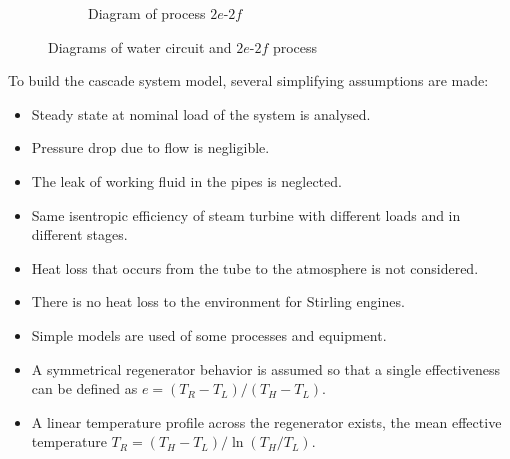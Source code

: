 \begin{figure}[htbp]
\begin{subfigure}[b]{0.45\columnwidth}
	\caption{Diagram of process $2e$-$2f$}\label{fig:HeatTransfer_Water-SEs}
	\end{subfigure}
	
	\caption{Diagrams of water circuit and $2e$-$2f$ process}\label{fig:Diagrams$2e$-$2f$}
\end{figure}




To build the cascade system model, several simplifying assumptions are made:

\begin{itemize}
	\item Steady state at nominal load of the system is analysed.
	\item Pressure drop due to flow is negligible.
	\item The leak of working fluid in the pipes is neglected.
	\item Same isentropic efficiency of steam turbine with different loads and in different stages.
	\item Heat loss that occurs from the tube to the atmosphere is not considered.
	\item There is no heat loss to the environment for Stirling engines.
	\item Simple models are used of some processes and equipment.
	\item A symmetrical regenerator behavior is assumed so that a single effectiveness can be defined as $e = (T_R - T_L) /(T_H - T_L)$.~\cite{Formosa2010, Juhasz2010}
	\item A linear temperature profile across the regenerator exists, the mean effective temperature $T_{R} = (T_H-T_L) / \ln(T_H/T_L)$.~\cite{Der2007, Cavazzuti2012}
\end{itemize}

